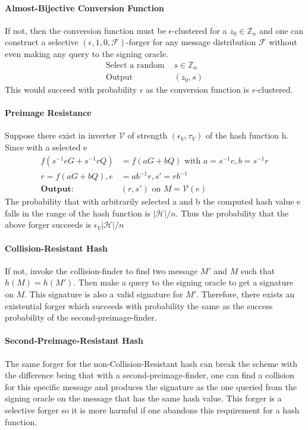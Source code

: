 \documentclass[18]{article}
\begin{document}
\paragraph{Almost-Bijective Conversion Function}
If not, then the conversion function must be $\epsilon$-clustered for a $z_0\in \mathbb{Z}_n$ and one can construct a selective
$(\epsilon, 1, 0, \mathscr{F})$-forger for any message distribution $\mathscr{F}$ without even making any query to the signing oracle.
\begin{align*}
\text{Select a random } &s\in \mathbb{Z}_n\\
\text{Output } &(z_0,s)
\end{align*}
This would succeed with probability $\epsilon$ as the conversion function is $\epsilon$-clustered.

\paragraph{Preimage Resistance}
Suppose there exist in inverter $\mathscr{V}$ of strength $(\epsilon_V, \tau_V)$ of the hash function h. Since with a selected e
\begin{align*}
f(s^{-1}eG+s^{-1}rQ) &= f(aG+bQ) \text{ with } a=s^{-1}e, b=s^{-1}r \\
r=f(aG+bQ), e&=ab^{-1}r,  s\prime = rb^{-1}\\
\textbf{Output: }&(r,s\prime) \text{ on } M=\mathscr{V}(e)
\end{align*}
The probability that with arbitrarily selected a and b the computed hash value e falls in the range of the hash function is $|\mathscr{H}|/n$. Thus the probability that the above forger succeeds is $\epsilon_V|\mathscr{H}|/n$
\paragraph{Collision-Resistant Hash}
If not, invoke the collision-finder to find two message $M'$ and $M$ such that $h(M)=h(M')$. Then make a query to the signing oracle to get a signature on $M$. This signature is also a valid signature for $M'$. Therefore, there exists an existential forger which succeeds with probability the same as the success probability of the second-preimage-finder.
\paragraph{Second-Preimage-Resistant Hash}
The same forger for the non-Collision-Resistant hash can break the scheme with the difference being that with a second-preimage-finder, one can find a collision for this specific message and produces the signature as the one queried from the signing oracle on the message that has the same hash value.
This forger is a selective forger so it is more harmful if one abandons this requirement for a hash function.
\end{document}
